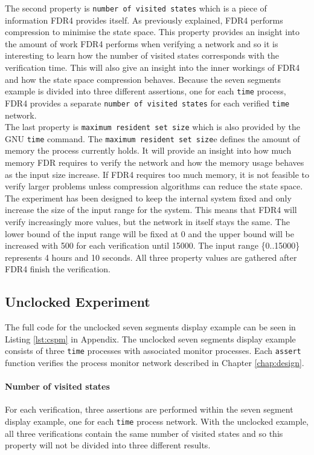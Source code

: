 The second property is \texttt{number of visited states} which is a piece of information FDR4 provides itself.
As previously explained, FDR4 performs compression to minimise the state space.
This property provides an insight into the amount of work FDR4 performs when verifying a network and so it is interesting to learn how the number of visited states corresponds with the verification time. This will also give an insight into the inner workings of FDR4 and how the state space compression behaves.
Because the seven segments example is divided into three different assertions, one for each \texttt{time} process, FDR4 provides a separate \texttt{number of visited states} for each verified \texttt{time} network. \\

The last property is \texttt{maximum resident set size} which is also provided by the GNU \texttt{time} command. The \texttt{maximum resident set size}e defines the amount of memory the process currently holds. It will provide an insight into how much memory FDR requires to verify the network and how the memory usage behaves as the input size increase. If FDR4 requires too much memory, it is not feasible to verify larger problems unless compression algorithms can reduce the state space. \\

The experiment has been designed to keep the internal system fixed and only increase the size of the input range for the system. This means that FDR4 will verify increasingly more values, but the network in itself stays the same.
The lower bound of the input range will be fixed at 0 and the upper bound will be increased with 500 for each verification until 15000. The input range \{0..15000\} represents 4 hours and 10 seconds. All three property values are gathered after FDR4 finish the verification.
\subsection{Unclocked Experiment}
The full code for the unclocked seven segments display example can be seen in Listing \ref{lst:cspm} in Appendix. %
The unclocked seven segments display example consists of three \texttt{time} processes with associated monitor processes. Each \texttt{assert} function verifies the process monitor network described in Chapter \ref{chap:design}.
\paragraph{Number of visited states}
For each verification, three assertions are performed within the seven segment display example, one for each \texttt{time} process network. With the unclocked example, all three verifications contain the same number of visited states and so this property will not be divided into three different results.\\

